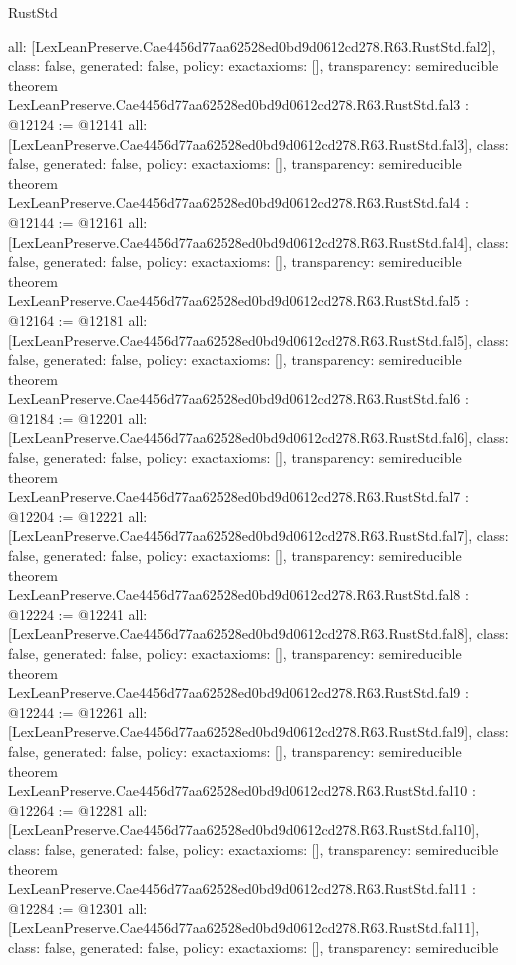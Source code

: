 \begin{lexlean}{RustStd}
\begin{coremodule}
{  all: [LexLeanPreserve.Cae4456d77aa62528ed0bd9d0612cd278.R63.RustStd.fal2],
  class: false,
  generated: false,
  policy: exact{axioms: []},
  transparency: semireducible
}
theorem LexLeanPreserve.Cae4456d77aa62528ed0bd9d0612cd278.R63.RustStd.fal3 : @12124 := @12141 {
  all: [LexLeanPreserve.Cae4456d77aa62528ed0bd9d0612cd278.R63.RustStd.fal3],
  class: false,
  generated: false,
  policy: exact{axioms: []},
  transparency: semireducible
}
theorem LexLeanPreserve.Cae4456d77aa62528ed0bd9d0612cd278.R63.RustStd.fal4 : @12144 := @12161 {
  all: [LexLeanPreserve.Cae4456d77aa62528ed0bd9d0612cd278.R63.RustStd.fal4],
  class: false,
  generated: false,
  policy: exact{axioms: []},
  transparency: semireducible
}
theorem LexLeanPreserve.Cae4456d77aa62528ed0bd9d0612cd278.R63.RustStd.fal5 : @12164 := @12181 {
  all: [LexLeanPreserve.Cae4456d77aa62528ed0bd9d0612cd278.R63.RustStd.fal5],
  class: false,
  generated: false,
  policy: exact{axioms: []},
  transparency: semireducible
}
theorem LexLeanPreserve.Cae4456d77aa62528ed0bd9d0612cd278.R63.RustStd.fal6 : @12184 := @12201 {
  all: [LexLeanPreserve.Cae4456d77aa62528ed0bd9d0612cd278.R63.RustStd.fal6],
  class: false,
  generated: false,
  policy: exact{axioms: []},
  transparency: semireducible
}
theorem LexLeanPreserve.Cae4456d77aa62528ed0bd9d0612cd278.R63.RustStd.fal7 : @12204 := @12221 {
  all: [LexLeanPreserve.Cae4456d77aa62528ed0bd9d0612cd278.R63.RustStd.fal7],
  class: false,
  generated: false,
  policy: exact{axioms: []},
  transparency: semireducible
}
theorem LexLeanPreserve.Cae4456d77aa62528ed0bd9d0612cd278.R63.RustStd.fal8 : @12224 := @12241 {
  all: [LexLeanPreserve.Cae4456d77aa62528ed0bd9d0612cd278.R63.RustStd.fal8],
  class: false,
  generated: false,
  policy: exact{axioms: []},
  transparency: semireducible
}
theorem LexLeanPreserve.Cae4456d77aa62528ed0bd9d0612cd278.R63.RustStd.fal9 : @12244 := @12261 {
  all: [LexLeanPreserve.Cae4456d77aa62528ed0bd9d0612cd278.R63.RustStd.fal9],
  class: false,
  generated: false,
  policy: exact{axioms: []},
  transparency: semireducible
}
theorem LexLeanPreserve.Cae4456d77aa62528ed0bd9d0612cd278.R63.RustStd.fal10 : @12264 := @12281 {
  all: [LexLeanPreserve.Cae4456d77aa62528ed0bd9d0612cd278.R63.RustStd.fal10],
  class: false,
  generated: false,
  policy: exact{axioms: []},
  transparency: semireducible
}
theorem LexLeanPreserve.Cae4456d77aa62528ed0bd9d0612cd278.R63.RustStd.fal11 : @12284 := @12301 {
  all: [LexLeanPreserve.Cae4456d77aa62528ed0bd9d0612cd278.R63.RustStd.fal11],
  class: false,
  generated: false,
  policy: exact{axioms: []},
  transparency: semireducible
}
\end{coremodule}
\end{lexlean}
